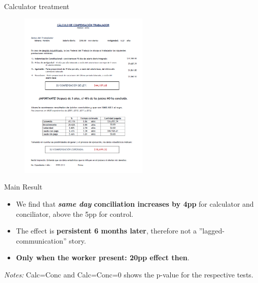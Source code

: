 \documentclass[9pt]{beamer}
\newcommand{\folder}{../Paper/Tables}
\begin{document}
\begin{frame}{Calculator treatment}

    \begin{figure}[H]
    \label{calc_template}
    \begin{center}
        \includegraphics[width=0.55\textwidth]{calctreat.png}
        \end{center}
\end{figure}
\end{frame}




\begin{frame}{Main Result}
    \begin{itemize}
        \item We find that \textbf{\textit{same day} conciliation increases by 4pp} for calculator and conciliator, above the 5pp for control.
        \vspace{0.05in}
        \item The effect is \textbf{persistent 6 months later}, therefore not a ''lagged-communication'' story. 
        \vspace{0.05in}
        \item \textbf{Only when the worker present: 20pp effect then}.
    \end{itemize}
  \hskip-6.0cm\begin{table}
    \label{Table_effects_F}
    \tiny{}
\end{table}
    \footnotesize
    \textit{Notes:} 
    Calc=Conc and Calc=Conc=0 shows the p-value for the respective tests.
\end{frame}
\end{document}
